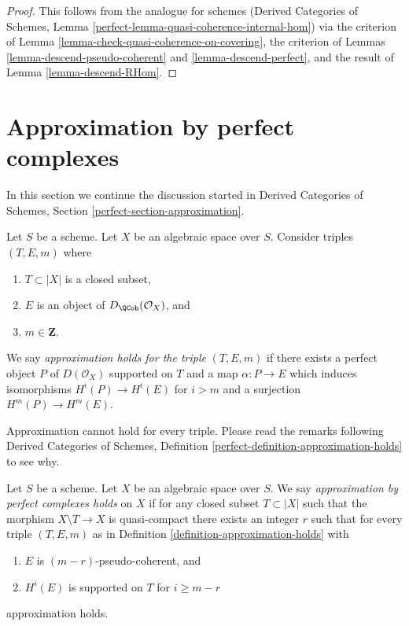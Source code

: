 \begin{proof}
This follows from the analogue for schemes
(Derived Categories of Schemes, Lemma
\ref{perfect-lemma-quasi-coherence-internal-hom})
via the criterion of Lemma \ref{lemma-check-quasi-coherence-on-covering},
the criterion of Lemmas \ref{lemma-descend-pseudo-coherent} and
\ref{lemma-descend-perfect},
and the result of Lemma \ref{lemma-descend-RHom}.
\end{proof}









\section{Approximation by perfect complexes}
\label{section-approximation}

\noindent
In this section we continue the discussion started in
Derived Categories of Schemes, Section \ref{perfect-section-approximation}.

\begin{definition}
\label{definition-approximation-holds}
Let $S$ be a scheme. Let $X$ be an algebraic space over $S$.
Consider triples $(T, E, m)$ where
\begin{enumerate}
\item $T \subset |X|$ is a closed subset,
\item $E$ is an object of $D_\QCoh(\mathcal{O}_X)$, and
\item $m \in \mathbf{Z}$.
\end{enumerate}
We say {\it approximation holds for the triple} $(T, E, m)$ if
there exists a perfect object $P$ of $D(\mathcal{O}_X)$ supported on $T$
and a map $\alpha : P \to E$ which induces isomorphisms $H^i(P) \to H^i(E)$
for $i > m$ and a surjection $H^m(P) \to H^m(E)$.
\end{definition}

\noindent
Approximation cannot hold for every triple. Please read the remarks following
Derived Categories of Schemes, Definition
\ref{perfect-definition-approximation-holds} to see why.

\begin{definition}
\label{definition-approximation}
Let $S$ be a scheme. Let $X$ be an algebraic space over $S$.
We say {\it approximation by perfect complexes holds}
on $X$ if for any closed subset $T \subset |X|$ such that
the morphism $X \setminus T \to X$ is quasi-compact
there exists an integer $r$ such that for every triple $(T, E, m)$ as in
Definition \ref{definition-approximation-holds} with
\begin{enumerate}
\item $E$ is $(m - r)$-pseudo-coherent, and
\item $H^i(E)$ is supported on $T$ for $i \geq m - r$
\end{enumerate}
approximation holds.
\end{definition}

